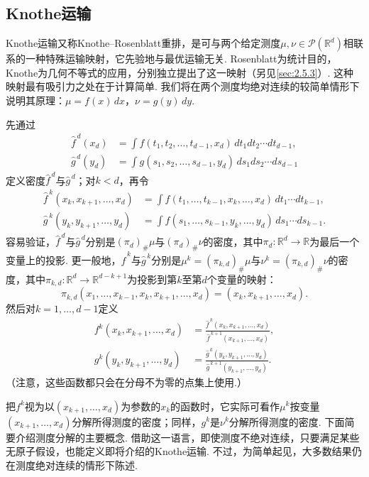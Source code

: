 \subsection{Knothe运输}\label{sec:2.3}

Knothe运输又称Knothe--Rosenblatt重排，是可与两个给定测度$\mu,\nu\in\mathscr P(\mathbb R^d)$相联系的一种特殊运输映射，它先验地与最优运输无关. Rosenblatt为统计目的\cite{b264}，Knothe为几何不等式的应用\cite{b203}，分别独立提出了这一映射（另见\autoref{sec:2.5.3}）. 这种映射最有吸引力之处在于计算简单. 我们将在两个测度均绝对连续的较简单情形下说明其原理：$\mu=f(x)\,dx$，$\nu=g(y)\,dy$.

先通过
\[
\begin{aligned}
\widehat f^{\,d}(x_d)&=\int f(t_1,t_2,\ldots,t_{d-1},x_d)\,dt_1dt_2\cdots dt_{d-1},\\
\widehat g^{\,d}(y_d)&=\int g(s_1,s_2,\ldots,s_{d-1},y_d)\,ds_1ds_2\cdots ds_{d-1}
\end{aligned}
\]
定义密度$\widehat f^{\,d}$与$\widehat g^{\,d}$；对$k<d$，再令
\[
\begin{aligned}
\widehat f^{\,k}(x_k,x_{k+1},\ldots,x_d)
&=\int f(t_1,\ldots,t_{k-1},x_k,\ldots,x_d)\,dt_1\cdots dt_{k-1},\\
\widehat g^{\,k}(y_k,y_{k+1},\ldots,y_d)
&=\int f(s_1,\ldots,s_{k-1},y_k,\ldots,y_d)\,ds_1\cdots ds_{k-1}.
\end{aligned}
\]
容易验证，$\widehat f^{\,d}$与$\widehat g^{\,d}$分别是$(\pi_d)_\#\mu$与$(\pi_d)_\#\nu$的密度，其中$\pi_d:\mathbb R^d\to\mathbb R$为最后一个变量上的投影. 更一般地，$\widehat f^{\,k}$与$\widehat g^{\,k}$分别是$\mu^k=(\pi_{k,d})_\#\mu$与$\nu^k=(\pi_{k,d})_\#\nu$的密度，其中$\pi_{k,d}:\mathbb R^d\to\mathbb R^{d-k+1}$为投影到第$k$至第$d$个变量的映射：
\[
\pi_{k,d}(x_1,\ldots,x_{k-1},x_k,x_{k+1},\ldots,x_d)=(x_k,x_{k+1},\ldots,x_d).
\]
然后对$k=1,\ldots,d-1$定义
\[
\begin{aligned}
f^k(x_k,x_{k+1},\ldots,x_d)&=\frac{\widehat f^{\,k}(x_k,x_{k+1},\ldots,x_d)}{\widehat f^{\,k+1}(x_{k+1},\ldots,x_d)},\\
g^k(y_k,y_{k+1},\ldots,y_d)&=\frac{\widehat g^{\,k}(y_k,y_{k+1},\ldots,y_d)}{\widehat g^{\,k+1}(y_{k+1},\ldots,y_d)}.
\end{aligned}
\]
（注意，这些函数都只会在分母不为零的点集上使用.）

把$f^k$视为以$(x_{k+1},\ldots,x_d)$为参数的$x_k$的函数时，它实际可看作$\mu^k$按变量$(x_{k+1},\ldots,x_d)$分解所得测度的密度；同样，$g^k$是$\nu^k$分解所得测度的密度. 下面简要介绍测度分解的主要概念. 借助这一语言，即使测度不绝对连续，只要满足某些无原子假设，也能定义即将介绍的Knothe运输. 不过，为简单起见，大多数结果仍在测度绝对连续的情形下陈述.

